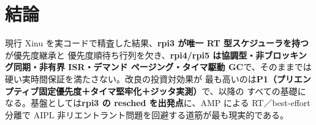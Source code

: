 \documentclass[11pt,a4paper]{article}
\begin{document}
\section{結論}
現行 Xinu を実コードで精査した結果、\textbf{rpi3 が唯一 RT 型スケジューラを持つ}が優先度継承と
優先度順待ち行列を欠き、\textbf{rpi4/rpi5 は協調型・非ブロッキング同期・非有界 ISR・デマンド
ページング・タイマ駆動 GC}で、そのままでは硬い実時間保証を満たさない。改良の投資対効果が
最も高いのは\textbf{P1（プリエンプティブ固定優先度＋タイマ堅牢化＋ジッタ実測）}で、以降の
すべての基礎になる。基盤としては\textbf{rpi3 の resched を出発点}に、AMP による RT／best-effort
分離で AIPL 非リエントラント問題を回避する道筋が最も現実的である。
\end{document}
